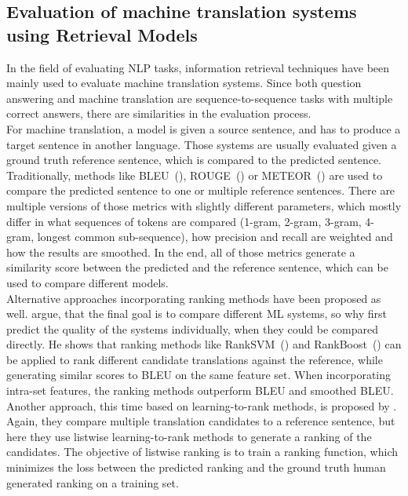 \subsection{Evaluation of machine translation systems using Retrieval Models}\label{sec:eval-mts-ir}
In the field of evaluating NLP tasks, information retrieval techniques have been mainly used to evaluate machine translation systems.
Since both question answering and machine translation are sequence-to-sequence tasks with multiple correct answers, there are similarities in the evaluation process.
\\
For machine translation, a model is given a source sentence, and has to produce a target sentence in another language.
Those systems are usually evaluated given a ground truth reference sentence, which is compared to the predicted sentence.
Traditionally, methods like BLEU~(\cite{papineni:2002}), ROUGE~(\cite{lin:2004}) or METEOR~(\cite{banerjee:2005}) are used to compare the predicted sentence to one or multiple reference sentences.
There are multiple versions of those metrics with slightly different parameters, which mostly differ in what sequences of tokens are compared (1-gram, 2-gram, 3-gram, 4-gram, longest common sub-sequence), how precision and recall are weighted and how the results are smoothed.
In the end, all of those metrics generate a similarity score between the predicted and the reference sentence, which can be used to compare different models.
\\
Alternative approaches incorporating ranking methods have been proposed as well.
\cite{duh:2008} argue, that the final goal is to compare different ML systems, so why first predict the quality of the systems individually, when they could be compared directly.
He shows that ranking methods like RankSVM~(\cite{joachims:2002}) and RankBoost~(\cite{freund:2003}) can be applied to rank different candidate translations against the reference, while generating similar scores to BLEU on the same feature set.
When incorporating intra-set features, the ranking methods outperform BLEU and smoothed BLEU.
\\
Another approach, this time based on learning-to-rank methods, is proposed by \cite{li:2013}.
Again, they compare multiple translation candidates to a reference sentence, but here they use listwise learning-to-rank methods to generate a ranking of the candidates.
The objective of listwise ranking is to train a ranking function, which minimizes the loss between the predicted ranking and the ground truth human generated ranking on a training set.
